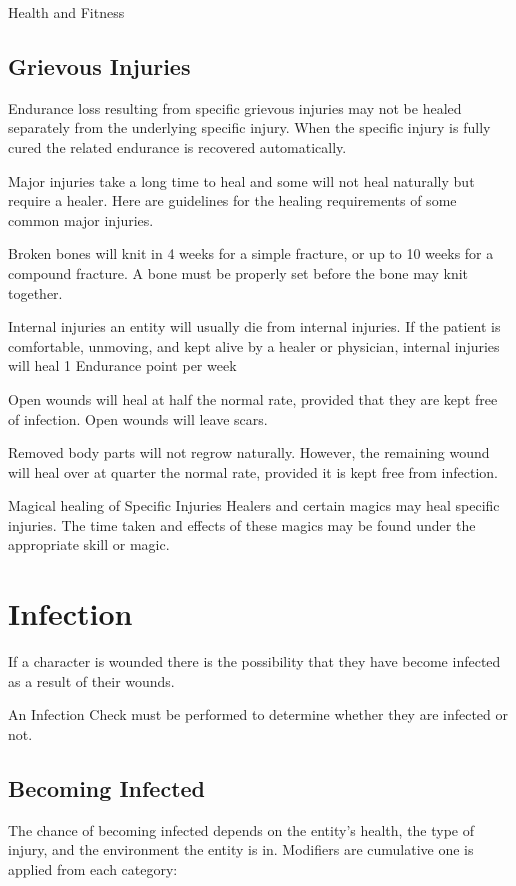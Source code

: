 \begin{Chapter}{Health and Fitness}
\subsection{Grievous Injuries}

Endurance loss resulting from specific grievous injuries may not be
healed separately from the underlying specific injury.  When the
specific injury is fully cured the related endurance is recovered
automatically.

Major injuries take a long time to heal and some will not heal
naturally but require a healer.  Here are guidelines for the healing
requirements of some common major injuries.

Broken bones will knit in 4 weeks for a simple fracture, or up to 10
weeks for a compound fracture.  A bone must be properly set before the
bone may knit together.

Internal injuries an entity will usually die from internal injuries.
If the patient is comfortable, unmoving, and kept alive by a healer or
physician, internal injuries will heal 1 Endurance point per week

Open wounds will heal at half the normal rate, provided that they are
kept free of infection. Open wounds will leave scars.

Removed body parts will not regrow naturally.  However, the remaining
wound will heal over at quarter the normal rate, provided it is kept
free from infection.

Magical healing of Specific Injuries Healers and certain magics may
heal specific injuries. The time taken and effects of these magics may
be found under the appropriate skill or magic.


\section{Infection}
\label{health:infection}
If a character is wounded there is the possibility that they have
become infected as a result of their wounds.

An Infection Check must be performed to determine whether they are
infected or not.

\subsection{Becoming Infected}

The chance of becoming infected depends on the entity’s health, the
type of injury, and the environment the entity is in.   Modifiers are
cumulative one is applied from each category:


\end{Chapter}
